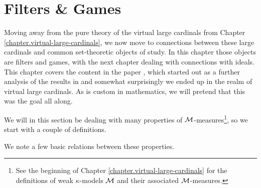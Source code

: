\documentclass[../../main]{subfiles}
\begin{document}
\chapter{Filters \& Games}
\label{chapter.filters-and-games}
\thispagestyle{fancy}

Moving away from the pure theory of the virtual large cardinals from Chapter \ref{chapter.virtual-large-cardinals}, we now move to connections between these large cardinals and common set-theoretic objects of study. In this chapter those objects are filters and games, with the next chapter dealing with connections with ideals. This chapter covers the content in the paper \cite{NielsenWelch}, which started out as a further analysis of the results in \cite{HolySchlicht} and somewhat surprisingly we ended up in the realm of virtual large cardinals. As is custom in mathematics, we will pretend that this was the goal all along.

\qquad We will in this section be dealing with many properties of $\operatorname{\mathcal M}$-measures\footnote{See the beginning of Chapter \ref{chapter.virtual-large-cardinals} for the definitions of weak $\kappa$-models $\operatorname{\mathcal M}$ and their associated $\operatorname{\mathcal M}$-measures.}, so we start with a couple of definitions.


We note a few basic relations between these properties.
\end{document}
